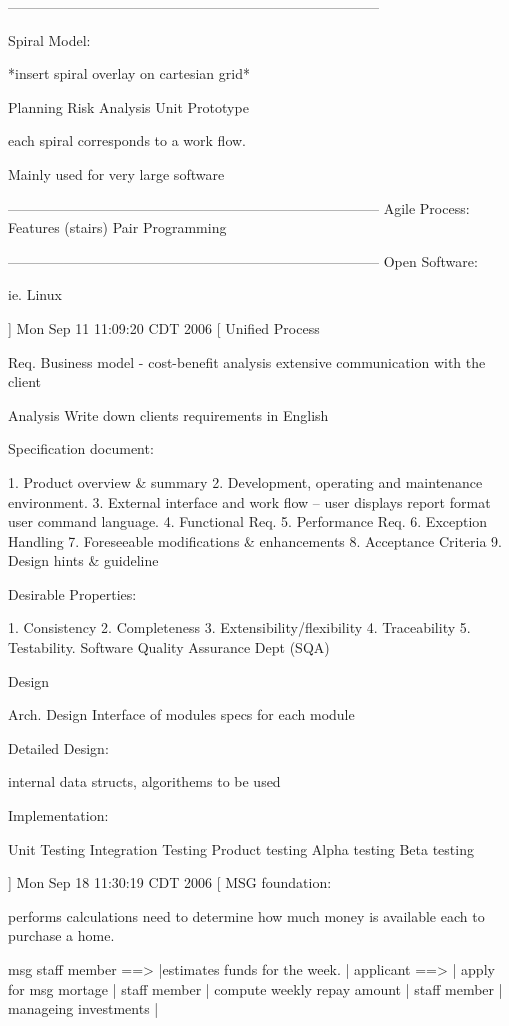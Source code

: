 \documentclass[a4paper]{article}
\begin{document}
{--------------------------------------------------------------------------------

Spiral Model:

*insert spiral overlay on cartesian grid*

Planning			Risk Analysis Unit Prototype

each spiral corresponds to a work flow.

Mainly used for very large software

--------------------------------------------------------------------------------
Agile Process:
	Features (stairs)
	Pair Programming


--------------------------------------------------------------------------------
Open Software:

 ie. Linux


]
Mon Sep 11 11:09:20 CDT 2006
[
Unified Process

   Req.		Business model - cost-benefit analysis
   				extensive communication with the client

   Analysis	Write down clients requirements in English

 
Specification document:

    1. Product overview & summary
	2. Development, operating and maintenance environment.
	3. External interface and work flow -- user displays report format user command language.
	4. Functional Req.
	5. Performance Req.
	6. Exception Handling
	7. Foreseeable modifications & enhancements
	8. Acceptance Criteria
	9. Design hints & guideline

Desirable Properties:

	1. Consistency
	2. Completeness
	3. Extensibility/flexibility
	4. Traceability
	5. Testability.						Software Quality Assurance Dept (SQA)

Design

		Arch. Design
		Interface of modules
		specs for each module


Detailed Design:
		
		internal data structs,
	 	algorithems to be used

Implementation:

		Unit Testing
		Integration Testing
		Product testing
		Alpha testing
		Beta testing

]
Mon Sep 18 11:30:19 CDT 2006
[
MSG foundation:

performs calculations need to determine how much money is available each to purchase a home.

msg staff member ==> |estimates funds for the week. |
applicant   ==>      | apply for msg mortage        |  
staff member	     | compute weekly repay amount  |
staff member	     | manageing investments	    |


}
\end{document}
